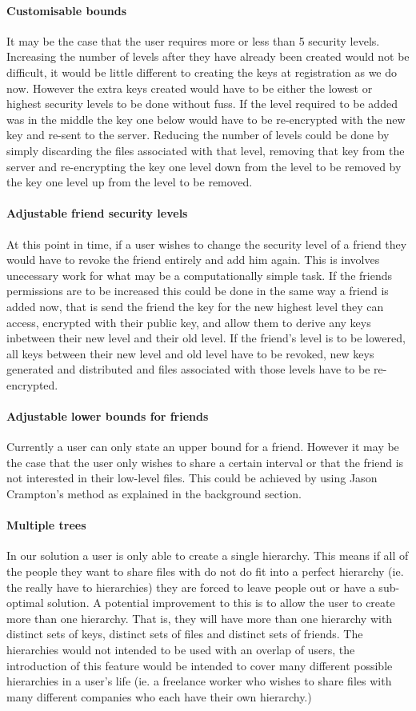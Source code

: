 \documentclass[12pt, titlepage]{article}
\begin{document}
\paragraph*{Customisable bounds} It may be the case that the user requires more or less than 5 security levels. Increasing the number of levels after they have already been created would not be difficult, it would be little different to creating the keys at registration as we do now. However the extra keys created would have to be either the lowest or highest security levels to be done without fuss. If the level required to be added was in the middle the key one below would have to be re-encrypted with the new key and re-sent to the server. Reducing the number of levels could be done by simply discarding the files associated with that level, removing that key from the server and re-encrypting the key one level down from the level to be removed by the key one level up from the level to be removed.
\paragraph*{Adjustable friend security levels} At this point in time, if a user wishes to change the security level of a friend they would have to revoke the friend entirely and add him again. This is involves unecessary work for what may be a computationally simple task. If the friends permissions are to be increased this could be done in the same way a friend is added now, that is send the friend the key for the new highest level they can access, encrypted with their public key, and allow them to derive any keys inbetween their new level and their old level. If the friend's level is to be lowered, all keys between their new level and old level have to be revoked, new keys generated and distributed and files associated with those levels have to be re-encrypted.
\paragraph*{Adjustable lower bounds for friends} Currently a user can only state an upper bound for a friend. However it may be the case that the user only wishes to share a certain interval or that the friend is not interested in their low-level files. This could be achieved by using Jason Crampton's method as explained in the background section.
\paragraph*{Multiple trees} In our solution a user is only able to create a single hierarchy. This means if all of the people they want to share files with do not do fit into a perfect hierarchy (ie. the really have to hierarchies) they are forced to leave people out or have a sub-optimal solution. A potential improvement to this is to allow the user to create more than one hierarchy. That is, they will have more than one hierarchy with distinct sets of keys, distinct sets of files and distinct sets of friends. The hierarchies would not intended to be used with an overlap of users, the introduction of this feature would be intended to cover many different possible hierarchies in a user's life (ie. a freelance worker who wishes to share files with many different companies who each have their own hierarchy.)
\end{document}
